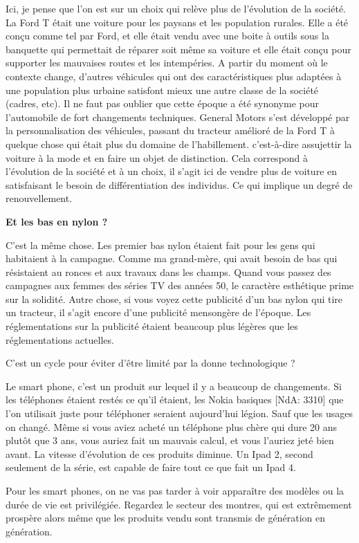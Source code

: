 \begin{small}
Ici, je pense que l'on est sur un choix qui relève plus de l'évolution de la société.
La Ford T était une voiture pour les paysans et les population rurales. Elle a été conçu comme tel par Ford, et elle était vendu avec une boite à outils sous la banquette qui permettait de réparer soit même sa voiture et elle était conçu pour supporter les mauvaises routes et les intempéries.
A partir du moment où le contexte change, d'autres véhicules qui ont des caractéristiques plus adaptées à une population plus urbaine satisfont mieux une autre classe de la société (cadres, etc).
Il ne faut pas oublier que cette époque a été synonyme pour l'automobile de fort changements techniques. General Motors s'est développé par la personnalisation des véhicules, passant du tracteur amélioré de la Ford T à quelque chose qui était plus du domaine de l'habillement. c'est-à-dire assujettir la voiture à la mode et en faire un objet de distinction.
Cela correspond à l'évolution de la société et à un choix, il s'agit ici de vendre plus de voiture en satisfaisant le besoin de différentiation des individus. Ce qui implique un degré de renouvellement.

\textbf{Et les bas en nylon ?}
\smallbreak


C'est la même chose. Les premier bas nylon étaient fait pour les gens qui habitaient à la campagne. Comme ma grand-mère, qui avait besoin de bas qui résistaient au ronces et aux travaux dans les champs.
Quand vous passez des campagnes aux femmes des séries TV des années 50, le caractère esthétique prime sur la solidité. Autre chose, si vous voyez cette publicité d'un bas nylon qui tire un tracteur, il s'agit encore d'une publicité mensongère de l'époque. Les réglementations sur la publicité étaient beaucoup plus légères que les réglementations actuelles.

C'est un cycle pour éviter d'être limité par la donne technologique ?

Le smart phone, c'est un produit sur lequel il y a beaucoup de changements. Si les téléphones étaient restés ce qu'il étaient, les Nokia basiques [NdA: 3310] que l'on utilisait juste pour téléphoner seraient aujourd'hui légion. Sauf que les usages on changé. Même si vous aviez acheté un téléphone plus chère qui dure 20 ans plutôt que 3 ans, vous auriez fait un mauvais calcul, et vous l'auriez jeté bien avant. La vitesse d'évolution de ces produits diminue. Un Ipad 2, second seulement de la série, est capable de faire tout ce que fait un Ipad 4.

Pour les smart phones, on ne vas pas tarder à voir apparaître des modèles ou la durée de vie est privilégiée. Regardez le secteur des montres, qui est extrêmement prospère alors même que les produits vendu sont transmis de génération en génération.


\end{small}
